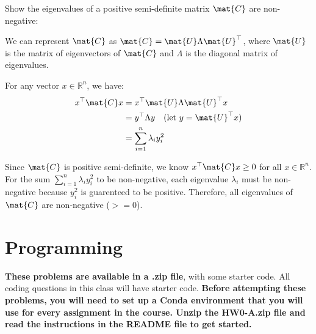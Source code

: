 \documentclass{article}
\begin{document}
\begin{aprob}
    \begin{tcolorbox}[colback=lightgray!10!white, colframe=black, title=A8.d]
        Show the eigenvalues of a positive semi-definite matrix $\mat{C}$ are non-negative:
            
            We can represent $\mat{C}$ as $\mat{C} = \mat{U}\Lambda\mat{U}^\top$, where $\mat{U}$ is the matrix of eigenvectors of $\mat{C}$ and $\Lambda$ is the diagonal matrix of eigenvalues.
            
            For any vector $x \in \mathbb{R}^n$, we have:
            \begin{align*}
                x^\top\mat{C}x &= x^\top\mat{U}\Lambda\mat{U}^\top x\\
                &= y^\top\Lambda y \quad \text{(let $y = \mat{U}^\top x$)}\\
                &= \sum_{i=1}^n \lambda_i y_i^2
            \end{align*}
            
            Since $\mat{C}$ is positive semi-definite, we know $x^\top\mat{C}x \geq 0$ for all $x \in \mathbb{R}^n$. 
            For the sum $\sum_{i=1}^n \lambda_i y_i^2$ to be non-negative, each eigenvalue $\lambda_i$ must be non-negative because $y_i^2$ is guarenteed to be positive.
            Therefore, all eigenvalues of $\mat{C}$ are non-negative ($>= 0$).
    \end{tcolorbox}
\end{aprob}


\section*{Programming}
\textbf{These problems are  available in a .zip file}, with some starter code. All coding questions in this class will have starter code.
\textbf{Before attempting these problems, you will need to set up a Conda environment that you will use for every assignment in the course. Unzip the HW0-A.zip file and read the instructions in the README file to get started.}
\end{document}
